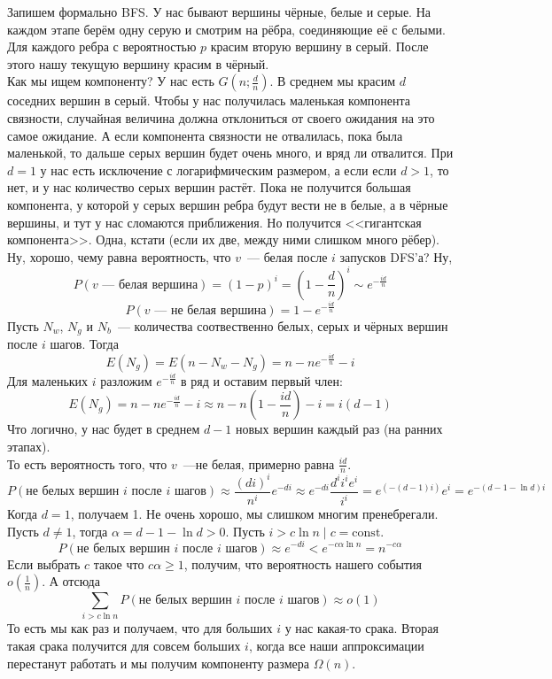\documentclass{article}
\begin{document}
    \begin{remark}
        Запишем формально BFS. У нас бывают вершины чёрные, белые и серые. На каждом этапе берём одну серую и смотрим на рёбра, соединяющие её с белыми. Для каждого ребра с вероятностью $p$ красим вторую вершину в серый. После этого нашу текущую вершину красим в чёрный.\\
        Как мы ищем компоненту? У нас есть $G(n;\frac dn)$. В среднем мы красим $d$ соседних вершин в серый. Чтобы у нас получилась маленькая компонента связности, случайная величина должна отклониться от своего ожидания на это самое ожидание. А если компонента связности не отвалилась, пока была маленькой, то дальше серых вершин будет очень много, и вряд ли отвалится. При $d=1$ у нас есть исключение с логарифмическим размером, а если если $d>1$, то нет, и у нас количество серых вершин растёт. Пока не получится большая компонента, у которой у серых вершин ребра будут вести не в белые, а в чёрные вершины, и тут у нас сломаются приближения. Но получится <<гигантская компонента>>. Одна, кстати (если их две, между ними слишком много рёбер).\\
        Ну, хорошо, чему равна вероятность, что $v$~--- белая после $i$ запусков DFS'а? Ну, $$P(v\text{~--- белая вершина})=(1-p)^i=\left(1-\frac dn\right)^i\sim e^{-\frac{id}n}$$
        $$P(v\text{~--- не белая вершина})=1-e^{-\frac{id}n}$$
        Пусть $N_w$, $N_g$ и $N_b$~--- количества соотвественно белых, серых и чёрных вершин после $i$ шагов. Тогда
        $$
        E(N_g)=E(n-N_w-N_g)=n-ne^{-\frac{id}n}-i
        $$
        Для маленьких $i$ разложим $e^{-\frac{id}n}$ в ряд и оставим первый член:
        $$
        E(N_g)=n-ne^{-\frac{id}n}-i\approx n-n\left(1-\frac{id}n\right)-i=i(d-1)
        $$
        Что логично, у нас будет в среднем $d-1$ новых вершин каждый раз (на ранних этапах).\\
        То есть вероятность того, что $v$~---не белая, примерно равна $\frac{id}n$.
        $$
        P(\text{не белых вершин }i\text{ после }i\text{ шагов})\approx\frac{(di)^i}{n^i}e^{-di}\approx e^{-di}\frac{d^ii^ie^i}{i^i}=e^{(-(d-1)i)}e^i=e^{-(d-1-\ln d)i}
        $$
        Когда $d=1$, получаем 1. Не очень хорошо, мы слишком многим пренебрегали.\\
        Пусть $d\neq1$, тогда $\alpha=d-1-\ln d>0$. Пусть $i>c\ln n\mid c=\mathrm{const}$.
        $$
        P(\text{не белых вершин }i\text{ после }i\text{ шагов})\approx e^{-di}<e^{-c\alpha\ln n}=n^{-c\alpha}
        $$
        Если выбрать $c$ такое что $c\alpha\geqslant1$, получим, что вероятность нашего события $o\left(\frac1n\right)$. А отсюда
        $$
        \sum\limits_{i>c\ln n}P(\text{не белых вершин }i\text{ после }i\text{ шагов})\approx o(1)
        $$
        То есть мы как раз и получаем, что для больших $i$ у нас какая-то срака. Вторая такая срака получится для совсем больших $i$, когда все наши аппроксимации перестанут работать и мы получим компоненту размера $\Omega(n)$.
    \end{remark}
\end{document}
